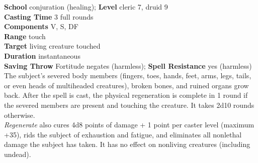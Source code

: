 \textbf{School} conjuration (healing); \textbf{Level} cleric 7, druid 9\\
\textbf{Casting Time} 3 full rounds\\
\textbf{Components} V, S, DF\\
\textbf{Range} touch\\
\textbf{Target} living creature touched\\
\textbf{Duration} instantaneous\\
\textbf{Saving Throw} Fortitude negates (harmless); \textbf{Spell Resistance} yes (harmless)\\
The subject's severed body members (fingers, toes, hands, feet, arms, legs, tails, or even heads of multiheaded creatures), broken bones, and ruined organs grow back. After the spell is cast, the physical regeneration is complete in 1 round if the severed members are present and touching the creature. It takes 2d10 rounds otherwise.\\
\textit{Regenerate }also cures 4d8 points of damage + 1 point per caster level (maximum +35), rids the subject of exhaustion and fatigue, and eliminates all nonlethal damage the subject has taken. It has no effect on nonliving creatures (including undead).\\

